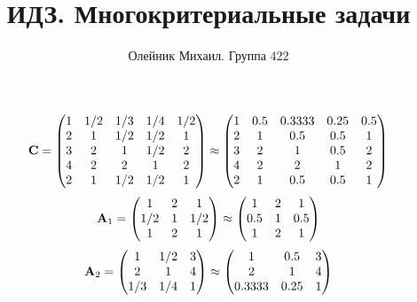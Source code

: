 \documentclass[10pt,a4paper]{article}
\title{ИДЗ. Многокритериальные задачи}
\author{Олейник Михаил. Группа 422}
\begin{document}
	\maketitle
	
	\[
		\bold{C} = 
		\begin{pmatrix}
			{1}{} & {1} / {{2}} & {1} / {{3}} & {1} / {{4}} & {1} / {{2}} \\
			{{2}}{} & {1}{} & {1} / {{2}} & {1} / {{2}} & {1}{} \\
			{{3}}{} & {{2}}{} & {1}{} & {1} / {{2}} & {{2}}{} \\
			{{4}}{} & {{2}}{} & {{2}}{} & {1}{} & {{2}}{} \\
			{{2}}{} & {1}{} & {1} / {{2}} & {1} / {{2}} & {1}{} \\
		\end{pmatrix}
		\approx
		\begin{pmatrix}
			1        & 0.5      & 0.3333   & 0.25     & 0.5      \\
			2        & 1        & 0.5      & 0.5      & 1        \\
			3        & 2        & 1        & 0.5      & 2        \\
			4        & 2        & 2        & 1        & 2        \\
			2        & 1        & 0.5      & 0.5      & 1        \\
		\end{pmatrix}
	\]
	\[
		\bold{A}_{1} = 
		\begin{pmatrix}
			{1}{} & {{2}}{} & {1}{} \\
			{1} / {{2}} & {1}{} & {1} / {{2}} \\
			{1}{} & {{2}}{} & {1}{} \\
		\end{pmatrix}
		\approx
		\begin{pmatrix}
			1        & 2        & 1        \\
			0.5      & 1        & 0.5      \\
			1        & 2        & 1        \\
		\end{pmatrix}
	\]
	\[
		\bold{A}_{2} = 
		\begin{pmatrix}
			{1}{} & {1} / {{2}} & {{3}}{} \\
			{{2}}{} & {1}{} & {{4}}{} \\
			{1} / {{3}} & {1} / {{4}} & {1}{} \\
		\end{pmatrix}
		\approx
		\begin{pmatrix}
			1        & 0.5      & 3        \\
			2        & 1        & 4        \\
			0.3333   & 0.25     & 1        \\
		\end{pmatrix}
	\]
\end{document}
